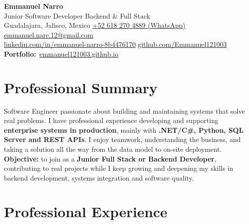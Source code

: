 \documentclass[11pt,a4paper]{article}
\begin{document}
\begin{center}
  {\color{ink}\Huge\bfseries Emmanuel Narro}\\[5pt]
  {\large\color{accent} Junior Software Developer \textbar{} Backend \& Full Stack}\\[7pt]
  {\color{muted}\small
   Guadalajara, Jalisco, Mexico \enspace\textbullet\enspace
   \href{https://wa.me/526182704889}{+52 618 270 4889 (WhatsApp)} \enspace\textbullet\enspace
   \href{mailto:emmanuel.nare.12@gmail.com}{emmanuel.nare.12@gmail.com}\\[3pt]
   \href{https://www.linkedin.com/in/emmanuel-narro-8b4476170}{linkedin.com/in/emmanuel-narro-8b4476170}
   \enspace\textbullet\enspace
   \href{https://github.com/Emmanuel121003}{github.com/Emmanuel121003}
   \enspace\textbullet\enspace
   {\color{accent}\textbf{Portfolio:}}~\href{https://emmanuel121003.github.io/}{emmanuel121003.github.io}}
\end{center}

\section{Professional Summary}
Software Engineer passionate about building and maintaining systems that solve real problems. I have professional
experience developing and supporting \textbf{enterprise systems in production}, mainly with \textbf{.NET/C\#, Python,
SQL Server and REST APIs}. I enjoy teamwork, understanding the business, and taking a solution all the way from the
data model to on-site deployment.
\\[3pt]
\textbf{Objective:} to join as a \textbf{Junior Full Stack or Backend Developer}, contributing to real projects while I
keep growing and deepening my skills in backend development, systems integration and software quality.

\section{Professional Experience}
\end{document}
